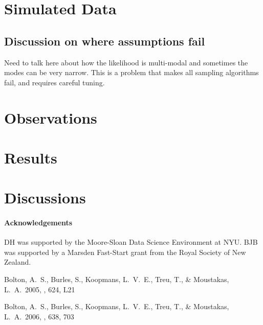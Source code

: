 \documentclass[12pt]{emulateapj}
\begin{document}
\begin{table*}[hbtp]
\begin{threeparttable}
\begin{tablenotes}
\end{tablenotes}
\end{threeparttable}
\label{tab:priortable}
\end{table*}



\section{Simulated Data}

\subsection{Discussion on where assumptions fail}

Need to talk here about how the likelihood is multi-modal and sometimes the modes can be very narrow. 
This is a problem that makes all sampling algorithms fail, and requires careful tuning.


\section{Observations}

\section{Results}


\section{Discussions}



\paragraph{Acknowledgements}
DH was supported by the Moore-Sloan Data Science Environment at NYU.
BJB was supported by a Marsden Fast-Start grant from the Royal Society of
New Zealand.



\begin{thebibliography}{999}

 Bolton, A.~S., Burles, 
S., Koopmans, L.~V.~E., Treu, T., 
\& Moustakas, L.~A.\ 2005, \apjl, 624, L21 

 Bolton, A.~S., Burles, 
S., Koopmans, L.~V.~E., Treu, T., \& Moustakas, L.~A.\ 2006, \apj, 638, 703 

\end{thebibliography}
\end{document}
